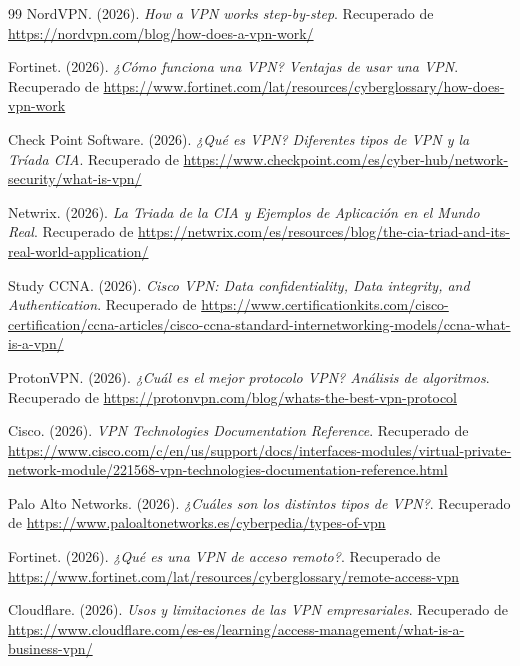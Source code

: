 \documentclass[a4paper,12pt]{article}
\begin{document}
\begin{thebibliography}{99}
    NordVPN. (2026). \textit{How a VPN works step-by-step}. Recuperado de \url{https://nordvpn.com/blog/how-does-a-vpn-work/}

    Fortinet. (2026). \textit{¿Cómo funciona una VPN? Ventajas de usar una VPN}. Recuperado de \url{https://www.fortinet.com/lat/resources/cyberglossary/how-does-vpn-work}

    Check Point Software. (2026). \textit{¿Qué es VPN? Diferentes tipos de VPN y la Tríada CIA}. Recuperado de \url{https://www.checkpoint.com/es/cyber-hub/network-security/what-is-vpn/}

    Netwrix. (2026). \textit{La Triada de la CIA y Ejemplos de Aplicación en el Mundo Real}. Recuperado de \url{https://netwrix.com/es/resources/blog/the-cia-triad-and-its-real-world-application/}

    Study CCNA. (2026). \textit{Cisco VPN: Data confidentiality, Data integrity, and Authentication}. Recuperado de \url{https://www.certificationkits.com/cisco-certification/ccna-articles/cisco-ccna-standard-internetworking-models/ccna-what-is-a-vpn/}

    ProtonVPN. (2026). \textit{¿Cuál es el mejor protocolo VPN? Análisis de algoritmos}. Recuperado de \url{https://protonvpn.com/blog/whats-the-best-vpn-protocol}

    Cisco. (2026). \textit{VPN Technologies Documentation Reference}. Recuperado de \url{https://www.cisco.com/c/en/us/support/docs/interfaces-modules/virtual-private-network-module/221568-vpn-technologies-documentation-reference.html}

    Palo Alto Networks. (2026). \textit{¿Cuáles son los distintos tipos de VPN?}. Recuperado de \url{https://www.paloaltonetworks.es/cyberpedia/types-of-vpn}

    Fortinet. (2026). \textit{¿Qué es una VPN de acceso remoto?}. Recuperado de \url{https://www.fortinet.com/lat/resources/cyberglossary/remote-access-vpn}

    Cloudflare. (2026). \textit{Usos y limitaciones de las VPN empresariales}. Recuperado de \url{https://www.cloudflare.com/es-es/learning/access-management/what-is-a-business-vpn/}


\end{thebibliography}
\end{document}
